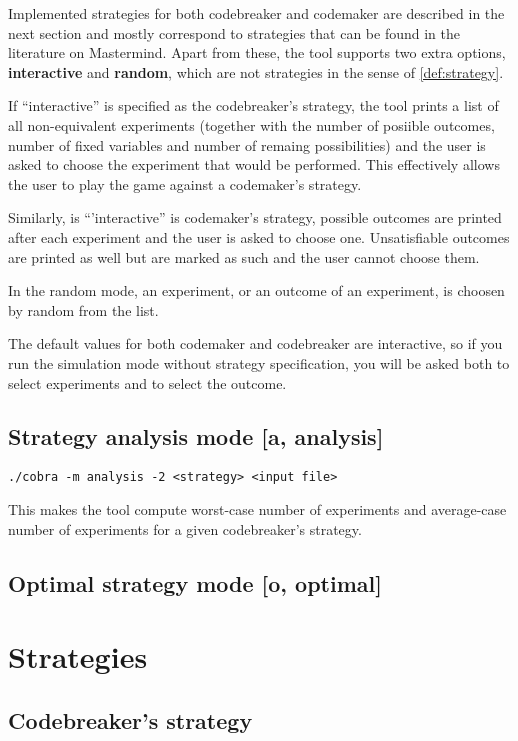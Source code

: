 Implemented strategies for both codebreaker and codemaker
  are described in the next section and mostly correspond to strategies
  that can be found in the literature on Mastermind.
Apart from these, the tool supports two extra options, \textbf{interactive}
  and \textbf{random}, which are not strategies in the sense of \autoref{def:strategy}.

If ``interactive'' is specified as the codebreaker's strategy,
  the tool prints a list of all non-equivalent experiments
  (together with the number of posiible outcomes, number of fixed variables
  and number of remaing possibilities) and the user is asked
  to choose the experiment that would be performed.
This effectively allows the user to play the game against a codemaker's strategy.

Similarly, is ``'interactive'' is codemaker's strategy, possible outcomes
  are printed after each experiment and the user is asked to choose one.
Unsatisfiable outcomes are printed as well but are marked as such and
  the user cannot choose them.

In the random mode, an experiment, or an outcome of an experiment, is
  choosen by random from the list.

The default values for both codemaker and codebreaker are interactive,
  so if you run the simulation mode without strategy specification,
  you will be asked both to select experiments and to select the outcome.

\subsection{Strategy analysis mode [a, analysis]}

\centerline{\texttt{./cobra -m analysis -2 <strategy> <input file> }}

This makes the tool compute worst-case number of experiments and
average-case number of experiments for a given codebreaker's strategy.


\subsection{Optimal strategy mode [o, optimal]}


\section{Strategies}

\subsection{Codebreaker's strategy}

